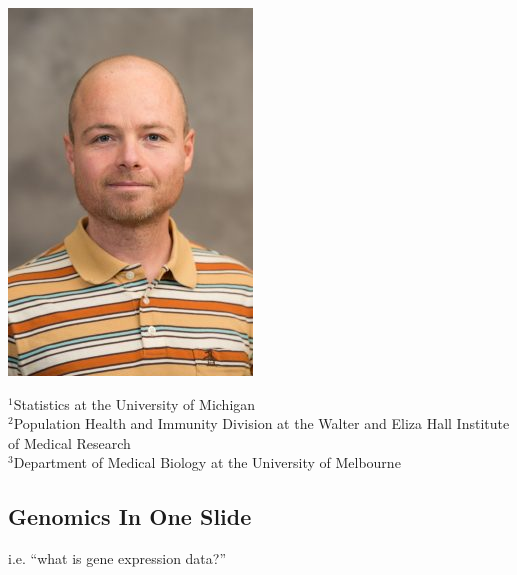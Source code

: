 \documentclass[usenames,dvipsnames,15pt,handout]{beamer}
\begin{document}
{\begin{frame}[noframenumbering]
  \includegraphics[scale=.31]{pictures/johann.jpg}

  \vspace{.25cm}
  {\scriptsize ${}^1$Statistics at the University of Michigan\\
  ${}^2$Population Health and Immunity Division at the Walter and Eliza Hall Institute of Medical Research\\
  ${}^3$Department of Medical Biology at the University of Melbourne}
\end{frame}

\begin{frame}[noframenumbering]
  \section{Genomics In One Slide}
  \begin{center}
    i.e. ``what is gene expression data?''
  \end{center}
\end{frame}
}
\end{document}
